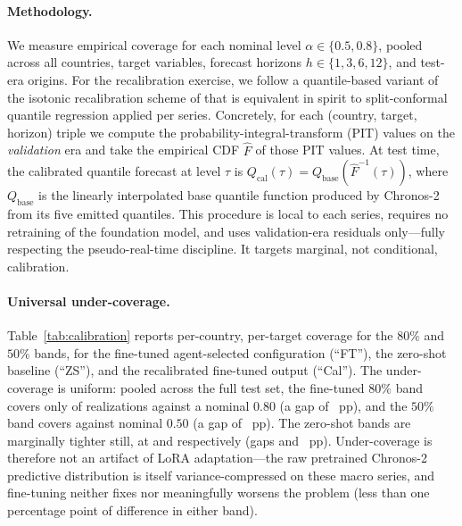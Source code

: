 \documentclass[12pt,a4paper]{article}
\begin{document}
\paragraph{Methodology.}
We measure empirical coverage for each nominal level $\alpha \in \{0.5, 0.8\}$, pooled across all \nCountries{} countries, target variables, forecast horizons $h \in \{1, 3, 6, 12\}$, and \nTestOrigins{} test-era origins. For the recalibration exercise, we follow a quantile-based variant of the isotonic recalibration scheme of \citet{kuleshov2018accurate} that is equivalent in spirit to split-conformal quantile regression \citep{romano2019conformalized} applied per series. Concretely, for each (country, target, horizon) triple we compute the probability-integral-transform (PIT) values on the \emph{validation} era and take the empirical CDF $\hat{F}$ of those PIT values. At test time, the calibrated quantile forecast at level $\tau$ is $Q_{\mathrm{cal}}(\tau) = Q_{\mathrm{base}}(\hat{F}^{-1}(\tau))$, where $Q_{\mathrm{base}}$ is the linearly interpolated base quantile function produced by Chronos-2 from its five emitted quantiles. This procedure is local to each series, requires no retraining of the foundation model, and uses validation-era residuals only---fully respecting the pseudo-real-time discipline. It targets marginal, not conditional, calibration.

\paragraph{Universal under-coverage.}
Table~\ref{tab:calibration} reports per-country, per-target coverage for the $80\%$ and $50\%$ bands, for the fine-tuned agent-selected configuration (``FT''), the zero-shot baseline (``ZS''), and the recalibrated fine-tuned output (``Cal''). The under-coverage is uniform: pooled across the full test set, the fine-tuned $80\%$ band covers only \pooledFTeighty{} of realizations against a nominal $0.80$ (a gap of \pooledFTeightyGap{}~pp), and the $50\%$ band covers \pooledFTfifty{} against nominal $0.50$ (a gap of \pooledFTfiftyGap{}~pp). The zero-shot bands are marginally tighter still, at \pooledZSeighty{} and \pooledZSfifty{} respectively (gaps \pooledZSeightyGap{} and \pooledZSfiftyGap{}~pp). Under-coverage is therefore not an artifact of LoRA adaptation---the raw pretrained Chronos-2 predictive distribution is itself variance-compressed on these macro series, and fine-tuning neither fixes nor meaningfully worsens the problem (less than one percentage point of difference in either band).
\end{document}
